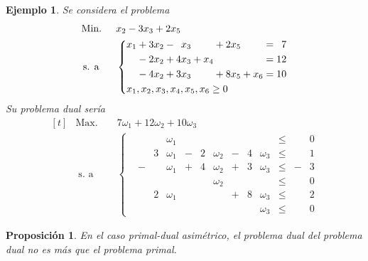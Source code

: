 \documentclass[11pt]{report}
\theoremstyle{mytheorem}
\newtheorem{proposition}{Proposición}
\theoremstyle{mydefinition}
\theoremstyle{myexample}
\newtheorem*{example}{Ejemplo}
\newenvironment{cproposition} %
  {\begin{mdframed}[
        linewidth=3pt,
        linecolor=c2,
        bottomline=false,
        topline=false,
        rightline=false,
        innerrightmargin=0pt,
        innertopmargin=0pt,
        innerbottommargin=0pt,
        innerleftmargin=1em,
        skipabove=\baselineskip]
    \begin{proposition}}
  {\end{proposition}\end{mdframed}}
\begin{document}
\begin{example}
Se considera el problema
\[\begin{aligned}[t]
&\text{Min. } && x_2-3x_3+2x_5 \\
& \, \text{s. a} && \left\{\begin{alignedat}{10}
& x_1 & {}+{} & 3x_2 & {}-{} &  &x_3 &       &     & {}+{} & 2x_5 &       &     & {}={} \phantom{0}7 \\
&     & {}-{} & 2x_2 & {}+{} & 4&x_3 & {}+{} & x_4 &       &      &       &     & {}={} 12 \\
&     & {}-{} & 4x_2 & {}+{} & 3&x_3 &       &     & {}+{} & 8x_5 & {}+{} & x_6 & {}={} 10 \\
& \mathrlap{x_1,x_2,x_3,x_4,x_5,x_6 \geq 0} \\
\end{alignedat}\right.
\end{aligned}
\]
Su problema dual sería
\[\begin{aligned}[t]
&\text{Max. } && 7\omega_1+12\omega_2+10\omega_3 \\
& \; \text{s. a} &&\left\{\begin{alignedat}{10}
& \phantom{-}&  &\omega_1 &       &  &         &       &  &         & {}\leq{} &  &0 \\
& \phantom{-}& 3&\omega_1 & {}-{} & 2&\omega_2 & {}-{} & 4&\omega_3 & {}\leq{} &  &1 \\
& {}-{}      &  &\omega_1 & {}+{} & 4&\omega_2 & {}+{} & 3&\omega_3 & {}\leq{} & -&3 \\
&            &  &         &       &  &\omega_2 &       &  &         & {}\leq{} &  &0 \\
& \phantom{-}& 2&\omega_1 &       &  &         & {}+{} & 8&\omega_3 & {}\leq{} &  &2 \\
&            &  &         &       &  &         &       &  &\omega_3 & {}\leq{} &  &0
\end{alignedat}\right.
\end{aligned}\] 
\end{example}

\begin{cproposition}
En el caso primal-dual asimétrico, el problema dual del problema dual no es más que el problema primal.
\end{cproposition}
\end{document}
